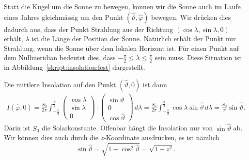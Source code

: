 Statt die Kugel um die Sonne zu bewegen, können wir die Sonne auch
im Laufe eines Jahres gleichmässig um den Punkt $(\hat\vartheta,\hat\varphi)$
bewegen.
Wir drücken dies dadurch aus, dass der Punkt Strahlung aus der Richtung
$(\cos\lambda,\sin\lambda,0)$ erhält, $\lambda$ ist die Länge der Position
der Sonne.
Natürlich erhält der Punkt nur Strahlung, wenn die Sonne über dem lokalen
Horizont ist.
Für einen Punkt auf dem Nullmeridian bedeutet dies, dass
$-\frac{\pi}2\le \lambda \le \frac{\pi}2$ sein muss.
Diese Situation ist in Abbildung~\ref{skript:insolation:fest} 
dargestellt.

Die mittlere Insolation auf den Punkt $(\hat\vartheta,0)$ ist dann
\begin{align*}
I(\hat\varphi,0)
=
\frac{S_0}{2\pi}
\int_{-\frac{\pi}2}^{\frac{\pi}2}
\begin{pmatrix}
\cos\lambda\\\sin\lambda\\0
\end{pmatrix}
\cdot
\begin{pmatrix}
\sin\hat\vartheta\\0\\\cos\hat\vartheta
\end{pmatrix}
\,d\lambda
=
\frac{S_0}{2\pi}
\int_{-\frac{\pi}2}^{\frac{\pi}2}
\cos\lambda\sin\hat\vartheta\,d\lambda
=
\frac{S_0}{\pi} \sin\hat\vartheta.
\end{align*}
Darin ist $S_0$ die Solarkonstante.
Offenbar hängt die Insolation nur von $\sin\hat\vartheta$ ab.
Wir können dies auch durch die $z$-Koordinate ausdrücken, es
ist nämlich
\begin{equation}
\sin\hat\vartheta = \sqrt{1-\cos^2\hat\vartheta}=\sqrt{1-z^2}.
\label{skript:einstrahlung:sintheta}
\end{equation}

